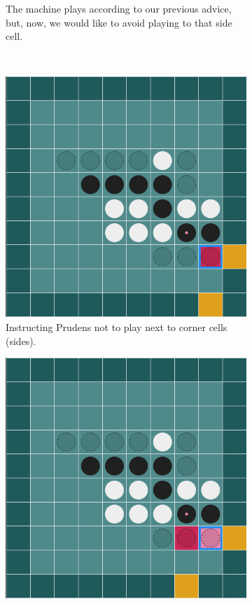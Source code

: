 \documentclass[a4paper,11pt]{article}
\theoremstyle{definition}
\theoremstyle{remark}
\numberwithin{equation}{section}
\begin{document}
\begin{figure}[!htb]
\begin{subfigure}[t]{0.48\textwidth}
			\caption{The machine plays according to our previous advice, but, now, we would like to avoid playing to that side cell.}
			\label{fig:201b}
		\end{subfigure}\\
		\vspace{2\topsep}
		\begin{subfigure}[t]{0.48\textwidth}
			\centering
			\includegraphics[width = \textwidth]{../assets/advice_002.png}
			\caption{Instructing Prudens not to play next to corner cells (sides).}
			\label{fig:201c}
		\end{subfigure}\hfill
		\begin{subfigure}[t]{0.48\textwidth}
			\centering
			\includegraphics[width = \textwidth]{../assets/advice_003.png}

\end{subfigure}
\end{figure}
\end{document}
